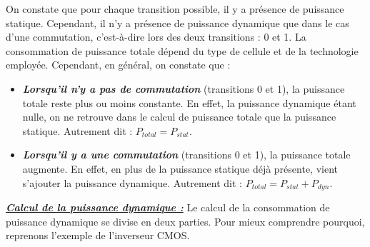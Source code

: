 \documentclass[oneside]{book}
\begin{document}
\hspace{-0.5 cm}On constate que pour chaque transition possible, il y a présence de puissance statique. Cependant, il n'y a présence de puissance dynamique que dans le cas d'une commutation, c'est-à-dire lors des deux transitions : 0 et 1.  La consommation de puissance totale dépend du type de cellule et de la technologie employée. Cependant, en général, on constate que : 
\begin{itemize}
\item \textbf{\textit{Lorsqu'il n'y a pas de commutation}} (transitions 0 et 1), la puissance totale reste plus ou moins constante. En effet, la puissance dynamique étant nulle, on ne retrouve dans le calcul de puissance totale que la puissance statique. Autrement dit : $P_{total}=P_{stat}$.
\item \textbf{\textit{Lorsqu'il y a une commutation}} (transitions 0 et 1), la puissance totale augmente. En effet, en plus de la puissance statique déjà présente, vient s'ajouter la puissance dynamique. Autrement dit : $P_{total}=P_{stat}+P_{dyn}$.
\end{itemize}

\vspace{+0.5 cm}\hspace{-0.5 cm}

\newpage
\hspace{-0.5 cm}\underline{\textbf{\textit{Calcul de la puissance dynamique :}}} 
Le calcul de la consommation de puissance dynamique se divise en deux parties. Pour mieux comprendre pourquoi, reprenons l'exemple de l'inverseur CMOS.
\end{document}
